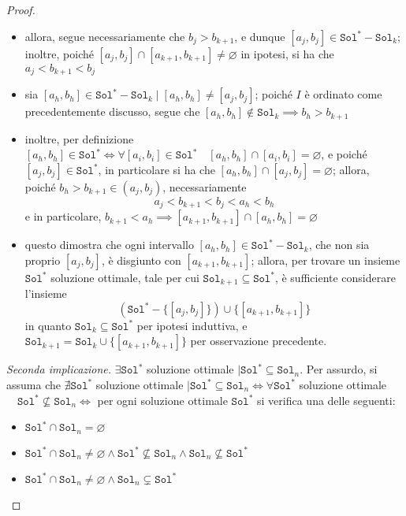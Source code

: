 \documentclass[14pt]{extreport}
\theoremstyle{definition}
\theoremstyle{definition}
\begin{document}
\begin{proof}
\begin{itemize}
\begin{itemize}
                \item allora, segue necessariamente che $b_j > b_{k + 1}$, e dunque $[a_j, b_j] \in \texttt{Sol}^* - \texttt{Sol}_k$; inoltre, poiché $[a_j, b_j] \cap [a_{k +1} , b_{k +1}] \neq \varnothing$ in ipotesi, si ha che $a_j < b_{k +1} < b_j$
                \item sia $[a_h, b_h] \in \texttt{Sol}^* - \texttt{Sol}_k \mid [a_h, b_h] \neq [a_j, b_j]$; poiché $I$ è ordinato come precedentemente discusso, segue che $[a_h, b_h] \notin \texttt{Sol}_k \implies b_h > b_{k +1}$
                \item inoltre, per definizione $[a_h, b_h] \in \texttt{Sol}^* \iff \forall [a_i, b_i] \in \texttt{Sol}^* \quad [a_h, b_h] \cap [a_i, b_i] = \varnothing$, e poiché $[a_j,b_j] \in \texttt{Sol}^*$, in particolare si ha che $[a_h, b_h] \cap [a_j, b_j] = \varnothing$; allora, poiché $b_h > b_{k + 1} \in (a_j, b_j)$, necessariamente $$a_j < b_{k +1} < b_j < a_h < b_h$$ e in particolare, $b_{k + 1} < a_h \implies [a_{k +1}, b_{k +1}] \cap [a_h, b_h] = \varnothing$
                \item questo dimostra che ogni intervallo $[a_h, b_h] \in \texttt{Sol}^* - \texttt{Sol}_k$, che non sia proprio $[a_j, b_j]$, è disgiunto con $[a_{k +1}, b_{k +1}]$; allora, per trovare un insieme $\texttt{Sol}^*$ soluzione ottimale, tale per cui $\texttt{Sol}_{k + 1} \subseteq \texttt{Sol}^*$, è sufficiente considerare l'insieme $$\left(\texttt{Sol}^* - \{[a_j, b_j]\}\right) \cup \{[a_{k +1}, b_{k +1}]\}$$ in quanto $\texttt{Sol}_k \subseteq \texttt{Sol}^*$ per ipotesi induttiva, e $\texttt{Sol}_{k + 1} = \texttt{Sol}_k \cup \{[a_{k +1}, b_{k + 1}]\}$ per osservazione precedente.
            \end{itemize}
            \textit{Seconda implicazione.} $\exists \texttt{Sol}^*$ soluzione ottimale $\mid \texttt{Sol}^* \subseteq \texttt{Sol}_n$. Per assurdo, si assuma che $\nexists \texttt{Sol}^*$ soluzione ottimale $\mid \texttt{Sol}^* \subseteq \texttt{Sol}_n \iff \forall \texttt{Sol}^*$ soluzione ottimale $\quad \texttt{Sol}^* \not \subseteq \texttt{Sol}_n \iff$ per ogni soluzione ottimale $\texttt{Sol}^*$ si verifica una delle seguenti:
            \begin{itemize}
                \item $\texttt{Sol}^* \cap \texttt{Sol}_n = \varnothing$
                \item $\texttt{Sol}^* \cap \texttt{Sol}_n \neq \varnothing \land \texttt{Sol}^* \not \subseteq \texttt{Sol}_n \land \texttt{Sol}_n \not \subseteq \texttt{Sol}^*$
                \item $\texttt{Sol}^* \cap \texttt{Sol}_n \neq \varnothing \land \texttt{Sol}_n \subsetneq \texttt{Sol}^*$
            \end{itemize}


\end{itemize}
\end{proof}
\end{document}

